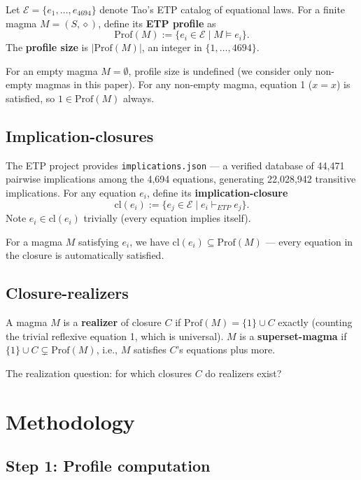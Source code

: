 \documentclass[11pt,reqno]{amsart}
\theoremstyle{plain}
\theoremstyle{definition}
\begin{document}
Let $\mathcal{E} = \{e_1, \ldots, e_{4694}\}$ denote Tao's ETP catalog of equational laws. For a finite magma $M = (S, \diamond)$, define its \textbf{ETP profile} as
$$\mathrm{Prof}(M) := \{e_i \in \mathcal{E} \mid M \models e_i\}.$$
The \textbf{profile size} is $|\mathrm{Prof}(M)|$, an integer in $\{1, \ldots, 4694\}$.

For an empty magma $M = \emptyset$, profile size is undefined (we consider only non-empty magmas in this paper). For any non-empty magma, equation 1 ($x = x$) is satisfied, so $1 \in \mathrm{Prof}(M)$ always.

\subsection{Implication-closures}

The ETP project provides \texttt{implications.json} --- a verified database of 44,471 pairwise implications among the 4,694 equations, generating 22,028,942 transitive implications. For any equation $e_i$, define its \textbf{implication-closure}
$$\mathrm{cl}(e_i) := \{e_j \in \mathcal{E} \mid e_i \vdash_{ETP} e_j\}.$$
Note $e_i \in \mathrm{cl}(e_i)$ trivially (every equation implies itself).

For a magma $M$ satisfying $e_i$, we have $\mathrm{cl}(e_i) \subseteq \mathrm{Prof}(M)$ --- every equation in the closure is automatically satisfied.

\subsection{Closure-realizers}

A magma $M$ is a \textbf{realizer} of closure $C$ if $\mathrm{Prof}(M) = \{1\} \cup C$ exactly (counting the trivial reflexive equation 1, which is universal). $M$ is a \textbf{superset-magma} if $\{1\} \cup C \subsetneq \mathrm{Prof}(M)$, i.e., $M$ satisfies $C$'s equations plus more.

The realization question: for which closures $C$ do realizers exist?

\section{Methodology}

\subsection{Step 1: Profile computation}
\end{document}
